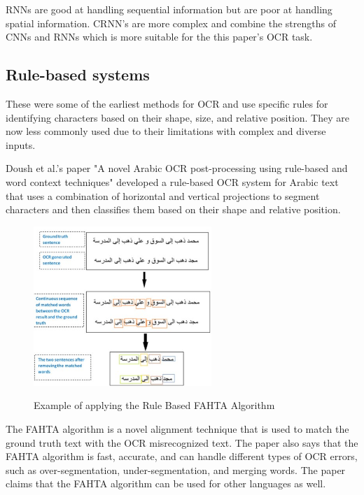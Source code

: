 RNNs are good at handling sequential information but are poor at handling spatial information. CRNN's are more complex and combine the strengths of CNNs and RNNs which is more suitable for the this paper's OCR task.



\newpage

\subsection{Rule-based systems}

These were some of the earliest methods for OCR and use specific rules for identifying characters based on their shape, size, and relative position. They are now less commonly used due to their limitations with complex and diverse inputs.

Doush et al.'s paper "A novel Arabic OCR post-processing using rule-based and word context techniques" developed a rule-based OCR system for Arabic text that uses a combination of horizontal and vertical projections to segment characters and then classifies them based on their shape and relative position. \cite{doushNovelArabicOCR2018}



\begin{figure}[ht]
    \centering
    \includegraphics[width=0.6\textwidth]{Figures/RB_Doush.jpg}
    \caption[Example of applying the Rule Based FAHTA Algorithm]{Example of applying the Rule Based FAHTA Algorithm}\cite{doushNovelArabicOCR2018}
    \label{fig:Doush Rule Based OCR Paper}
\end{figure}

The FAHTA algorithm is a novel alignment technique that is used to match the ground truth text with the OCR misrecognized text. The paper also says that the FAHTA algorithm is fast, accurate, and can handle different types of OCR errors, such as over-segmentation, under-segmentation, and merging words. The paper claims that the FAHTA algorithm can be used for other languages as well.


